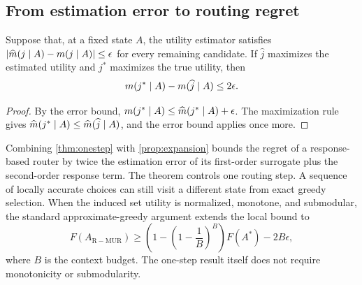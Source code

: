 \subsection{From estimation error to routing regret}

\begin{theorem}
\label{thm:onestep}
Suppose that, at a fixed state $A$, the utility estimator satisfies
$|\widehat{m}(j\mid A)-m(j\mid A)|\leq\epsilon$ for every
remaining candidate. If $\widehat{j}$ maximizes the estimated utility and
$j^*$ maximizes the true utility, then
\begin{equation}
 m(j^*\mid A)-m(\widehat{j}\mid A)\leq 2\epsilon.
\end{equation}
\end{theorem}

\begin{proof}
By the error bound,
$m(j^*\mid A)\leq\widehat{m}(j^*\mid A)+\epsilon$.
The maximization rule gives
$\widehat{m}(j^*\mid A)\leq
\widehat{m}(\widehat{j}\mid A)$, and the error bound applies once more.
\end{proof}

Combining \cref{thm:onestep} with \cref{prop:expansion} bounds the regret of a
response-based router by twice the estimation error of its first-order
surrogate plus the second-order response term. The theorem controls one
routing step. A sequence of locally accurate choices can still visit a
different state from exact greedy selection. When the induced set utility is
normalized, monotone, and submodular, the standard approximate-greedy argument
extends the local bound to
\begin{equation}
 F(A_{\mathrm{R-MUR}})
 \geq
 \left(1-\left(1-\frac{1}{B}\right)^B\right)F(A^*)-2B\epsilon,
\end{equation}
where $B$ is the context budget. The one-step result itself does not require
monotonicity or submodularity.

